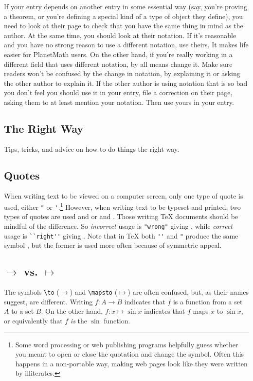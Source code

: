 If your entry depends on another entry in some essential way (say, you're proving a theorem, or you're defining a special kind of a type of object they define), you need to look at their page to check that you have the same thing in mind as the author. At the same time, you should look at their notation. If it's reasonable and you have no strong reason to use a different notation, use theirs. It makes life easier for PlanetMath users. On the other hand, if you're really working in a different field that uses different notation, by all means change it. Make sure readers won't be confused by the change in notation, by explaining it or asking the other author to explain it. If the other author is using notation that is so bad you don't feel you should use it in your entry, file a correction on their page, asking them to at least mention your notation. Then use yours in your entry.

\subsection*{The Right Way\texttrademark}
Tips, tricks, and advice on how to do things the right way.

\subsection{Quotes}
When writing text to be viewed on a computer screen, only one type
of quote is used, either
{\tt \verb|"|}
 or
{\tt \verb|'|}.\footnote{Some word processing or web publishing
programs helpfully guess whether you meant to open or close the
quotation and change the symbol. Often this happens in a non-portable
way, making web pages look like they were written by illiterates.}
However, when writing
text to be typeset and printed, two types of quotes are used 
and 
or  and . Those writing TeX documents should be mindful of the
difference. So \emph{incorrect} usage is \verb|"wrong"| giving ,
while \emph{correct} usage is \verb|``right''| giving .
Note that in TeX both \verb|''| and \verb|"| produce the same symbol
, but the former is used more often because of symmetric appeal.

\subsection{$\to$ vs. $\mapsto$}
The symbols \verb|\to| ($\to$) and \verb|\mapsto| ($\mapsto$) are often
confused, but, as their names suggest, are different. Writing
$f\colon A\to B$ indicates that $f$ is a function from a set $A$ to a set $B$.
On the other hand, $f\colon x\mapsto \sin x$ indicates that $f$ maps $x$ to
$\sin x$, or equivalently that $f$ \emph{is} the $\sin$ function.


